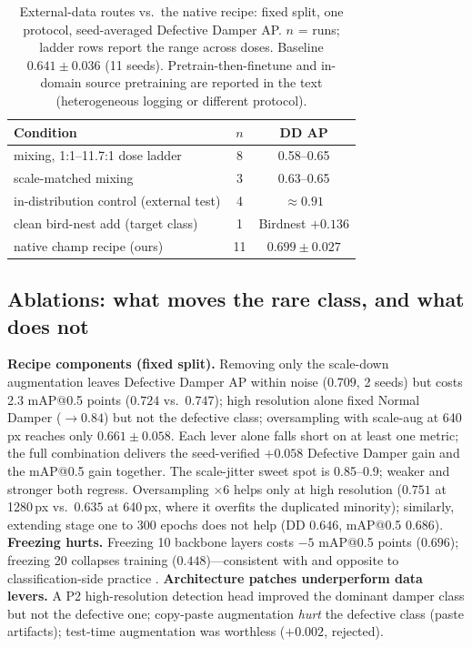 \documentclass[conference]{IEEEtran}
\makeatletter
\newcommand{\dd}{Defective Damper}
\newcommand{\map}{mAP@0.5}
\makeatother
\begin{document}
\begin{table}[t]
\caption{External-data routes vs.\ the native recipe: fixed split, one protocol, seed-averaged \dd{} AP. $n$ = runs; ladder rows report the range across doses. Baseline $0.641\pm0.036$ (11 seeds). Pretrain-then-finetune and in-domain source pretraining are reported in the text (heterogeneous logging or different protocol).}
\label{tab:external}
\centering
\footnotesize
\setlength{\tabcolsep}{4pt}
\begin{tabular}{lcc}
\toprule
Condition & $n$ & DD AP \\
\midrule
mixing, 1:1--11.7:1 dose ladder & 8 & 0.58--0.65 \\
scale-matched mixing & 3 & 0.63--0.65 \\
\midrule
in-distribution control (external test) & 4 & ${\approx}0.91$ \\
clean bird-nest add (target class) & 1 & Birdnest $+0.136$ \\
\midrule
native champ recipe (ours) & 11 & $\mathbf{0.699\pm0.027}$ \\
\bottomrule
\end{tabular}
\end{table}

\subsection{Ablations: what moves the rare class, and what does not}
\label{sec:ablate}
\textbf{Recipe components (fixed split).} Removing only the scale-down augmentation leaves \dd{} AP within noise ($0.709$, 2 seeds) but costs 2.3 \map{} points ($0.724$ vs.\ $0.747$); high resolution alone fixed Normal Damper (${\to}0.84$) but not the defective class; oversampling with scale-aug at 640\,px reaches only $0.661\pm0.058$. Each lever alone falls short on at least one metric; the full combination delivers the seed-verified $+0.058$ \dd{} gain and the \map{} gain together. The scale-jitter sweet spot is 0.85--0.9; weaker and stronger both regress. Oversampling $\times6$ helps only at high resolution ($0.751$ at 1280\,px vs.\ $0.635$ at 640\,px, where it overfits the duplicated minority); similarly, extending stage one to 300 epochs does not help (DD $0.646$, \map{} $0.686$). \textbf{Freezing hurts.} Freezing 10 backbone layers costs $-5$ \map{} points ($0.696$); freezing 20 collapses training ($0.448$)---consistent with \cite{tsai2025atli} and opposite to classification-side practice \cite{shakiba2022insulator}. \textbf{Architecture patches underperform data levers.} A P2 high-resolution detection head improved the dominant damper class but not the defective one; copy-paste augmentation \emph{hurt} the defective class (paste artifacts); test-time augmentation was worthless ($+0.002$, rejected).
\end{document}
